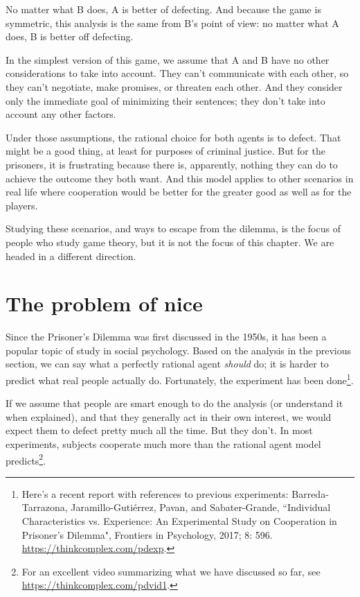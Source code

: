 \documentclass[12pt]{book}
\theoremstyle{exercise}
\begin{document}
No matter what B does, A is better of defecting.
And because the game is symmetric, this analysis is the same from B's point of view: no matter what A does, B is better off defecting.

In the simplest version of this game, we assume that A and B have no other considerations to take into account.  They can't communicate with each other, so they can't negotiate, make promises, or threaten each other.  And they consider only the immediate goal of minimizing their sentences; they don't take into account any other factors.


Under those assumptions, the rational choice for both agents is to defect.  That might be a good thing, at least for purposes of criminal justice.  But for the prisoners, it is frustrating because there is, apparently, nothing they can do to achieve the outcome they both want.  And this model applies to other scenarios in real life where cooperation would be better for the greater good as well as for the players.

Studying these scenarios, and ways to escape from the dilemma, is the focus of people who study game theory, but it is not the focus of this chapter.  We are headed in a different direction.


\section{The problem of nice}

Since the Prisoner's Dilemma was first discussed in the 1950s, it has been a popular topic of study in social psychology.  Based on the analysis in the previous section, we can say what a perfectly rational agent {\em should} do; it is harder to predict what real people actually do.  Fortunately, the experiment has been done\footnote{Here's a recent report with references to previous experiments:
Barreda-Tarrazona, Jaramillo-Guti\'{e}rrez, Pavan, and Sabater-Grande,
``Individual Characteristics vs. Experience: An Experimental Study on Cooperation in Prisoner's Dilemma", Frontiers in Psychology, 2017; 8: 596.
\url{https://thinkcomplex.com/pdexp}.}.


If we assume that people are smart enough to do the analysis (or understand it when explained), and that they generally act in their own interest, we would expect them to defect pretty much all the time.  But they don't.  In most experiments, subjects cooperate much more than the rational agent model predicts\footnote{For an excellent video summarizing what we have discussed so far, see \url{https://thinkcomplex.com/pdvid1}.}.
\end{document}
